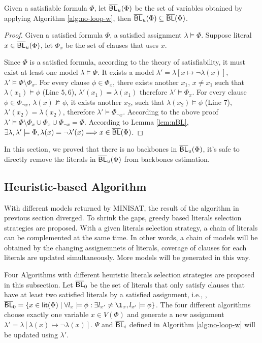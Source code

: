 \begin{theorem}
Given a satisfiable formula $\Phi$, let $\overline{\textsf{BL}}_u(\Phi)$ be the set of variables obtained by applying Algorithm \ref{alg:no-loop-w}, then $\overline{\textsf{BL}}_u(\Phi)\subseteq\overline{\textsf{BL}}(\Phi)$.
\end{theorem}
\begin{proof}

Given a satisfied formula $\Phi$, a satisfied assignment $\lambda\models\Phi$.
Suppose literal $x\in \overline{\textsf{BL}}_u(\Phi)$, let $\Phi_{x}$ be the set of clauses that uses $x$.

Since $\Phi$ is a satisfied formula, according to the theory of satisfiability, it must exist at least one model $\lambda\models\Phi$. It exists a model $\lambda'=\lambda[x\mapsto\neg\lambda(x)]$, $\lambda'\models\Phi\setminus\Phi_{x}$.
For every clause $\phi\in\Phi_{x}$, there exists another ${x_1}$, $x\neq x_1$ such that $\lambda(x_1)\models\phi$ (Line $5,6$), $\lambda'(x_1)=\lambda(x_1)$ therefore $\lambda'\models\Phi_{x}$.
For every clause $\phi\in\Phi_{\neg x}$, $\lambda(x)\not\models\phi$, it exists another ${x_2}$, such that $\lambda(x_2)\models\phi$ (Line $7$), $\lambda'(x_2)=\lambda(x_2)$, therefore $\lambda'\models\Phi_{\neg x}$.
According to the above proof $\lambda'\models\Phi\setminus\Phi_{x}\cup\Phi_{x}\cup\Phi_{\neg x}=\Phi$.
According to Lemma \ref{lem:nBL}, $\exists \lambda, \lambda'\models\Phi, \lambda(x)=\neg \lambda'(x)\Longrightarrow x\in\overline{\textsf{BL}}(\Phi)$.
\end{proof}

In this section, we proved that there is no backbones in $\overline{\textsf{BL}}_u(\Phi)$, it's safe to directly remove the literals in $\overline{\textsf{BL}}_u(\Phi)$ from backbones estimation.


\subsection{Heuristic-based Algorithm}

With different models returned by MINISAT, the result of the algorithm in previous section diverged. To shrink the gaps, greedy based literals selection strategies are proposed. With a given literals selection strategy, a chain of literals can be complemented at the same time. In other words, a chain of models will be obtained by the changing assignemnets of literals, coverage of clauses for each literals are updated simultaneously. More models will be generated in this way.

Four Algorithms with different heuristic literals selection strategies are proposed in this subsection.
Let $\overline{\textsf{BL}}_0$ be the set of literals that only satisfy clauses that have at least two satisfied literals by a satisfied assignment,
i.e., , $\NBL_0=\{x\in\Lit(\Phi) \mid \forall l_x\models\phi: \exists l_{x'}\neq\l_x, l_{x'}\models\phi\}$.
The four different algorithms choose exactly one variable $x\in V(\Phi)$ and generate a new assignment
$\lambda'=\lambda[\lambda(x)\mapsto\neg\lambda(x)]$.
$\Psi$ and $\overline{\textsf{BL}}_i$ defined in Algorithm \ref{alg:no-loop-w} will be updated using $\lambda'$.

